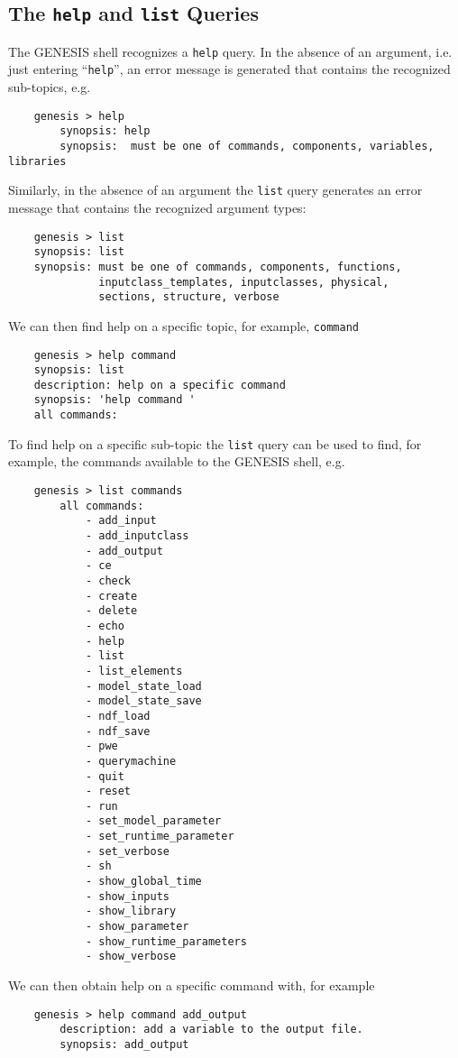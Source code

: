\documentclass[12pt]{article}
\begin{document}
\subsection*{The {\tt help} and {\tt list} Queries}
The GENESIS shell recognizes a {\tt help} query. In the absence of an argument, i.e. just entering ``{\tt help}'', an error message is generated that contains the recognized sub-topics, e.g.
\begin{verbatim}
    genesis > help
        synopsis: help 
        synopsis:  must be one of commands, components, variables, libraries
\end{verbatim}
Similarly, in the absence of an argument the {\tt list} query generates an error message that contains the recognized argument types:
\begin{verbatim}
    genesis > list
    synopsis: list
    synopsis: must be one of commands, components, functions,
              inputclass_templates, inputclasses, physical,
              sections, structure, verbose
\end{verbatim}
We can then find help on a specific topic, for example, {\tt command}
\begin{verbatim}
    genesis > help command
    synopsis: list
    description: help on a specific command
    synopsis: 'help command '
    all commands:
\end{verbatim}
To find help on a specific sub-topic the {\tt list} query can be used to find, for example, the commands available to the GENESIS shell, e.g.
\begin{verbatim}
    genesis > list commands 
        all commands:
            - add_input
            - add_inputclass
            - add_output
            - ce
            - check
            - create
            - delete
            - echo
            - help
            - list
            - list_elements
            - model_state_load
            - model_state_save
            - ndf_load
            - ndf_save
            - pwe
            - querymachine
            - quit
            - reset
            - run
            - set_model_parameter
            - set_runtime_parameter
            - set_verbose
            - sh
            - show_global_time
            - show_inputs
            - show_library
            - show_parameter
            - show_runtime_parameters
            - show_verbose
\end{verbatim}
We can then obtain help on a specific command with, for example
\begin{verbatim}
    genesis > help command add_output
        description: add a variable to the output file.
        synopsis: add_output
\end{verbatim}
\end{document}
